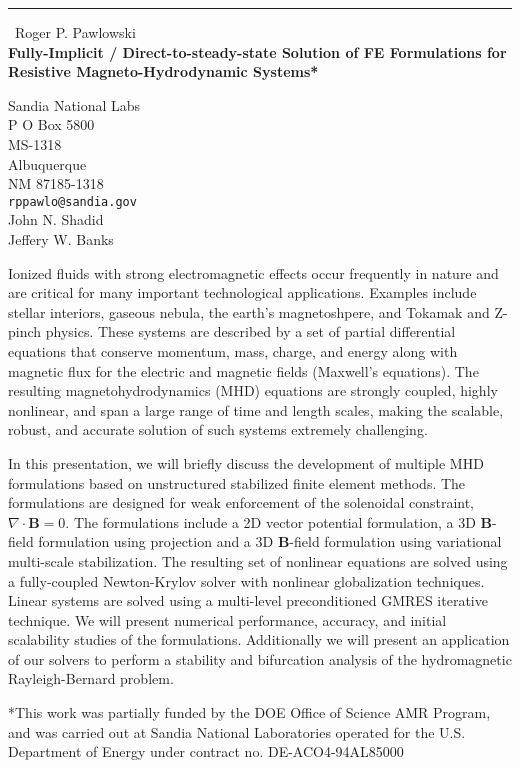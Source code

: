 \documentclass{report}
\begin{document}
\begin{center}
\rule{6in}{1pt} \
{\large Roger P. Pawlowski \\
{\bf Fully-Implicit / Direct-to-steady-state Solution of FE Formulations for Resistive Magneto-Hydrodynamic Systems*}}

Sandia National Labs \\ P O Box 5800 \\ MS-1318 \\ Albuquerque \\ NM 87185-1318
\\
{\tt rppawlo@sandia.gov}\\
John N. Shadid\\
Jeffery W. Banks\end{center}

Ionized fluids with strong electromagnetic effects occur frequently in
nature and are critical for many important technological applications.
Examples include stellar interiors, gaseous nebula, the earth's
magnetoshpere, and Tokamak and Z-pinch physics. These systems are
described by a set of partial differential equations that conserve
momentum, mass, charge, and energy along with magnetic flux for the
electric and magnetic fields (Maxwell's equations). The resulting
magnetohydrodynamics (MHD) equations are strongly coupled, highly
nonlinear, and span a large range of time and length scales, making the
scalable, robust, and accurate solution of such systems extremely
challenging.

In this presentation, we will briefly discuss the development of multiple
MHD formulations based on unstructured stabilized finite element methods.
The formulations are designed for weak enforcement of the solenoidal
constraint, $\nabla \cdot {\mathbf B}=0$. The formulations include a 2D
vector potential formulation, a 3D ${\mathbf B}$-field formulation using
projection and a 3D ${\mathbf B}$-field formulation using variational
multi-scale stabilization. The resulting set of nonlinear equations are
solved using a fully-coupled Newton-Krylov solver with nonlinear
globalization techniques. Linear systems are solved using a multi-level
preconditioned GMRES iterative technique. We will present numerical
performance, accuracy, and initial scalability studies of the
formulations. Additionally we will present an application of our solvers
to perform a stability and bifurcation analysis of the hydromagnetic
Rayleigh-Bernard problem.

*This work was partially funded by the DOE Office of Science AMR Program,
and was carried out at Sandia National Laboratories operated for the U.S.
Department of Energy under contract no. DE-ACO4-94AL85000
\end{document}
